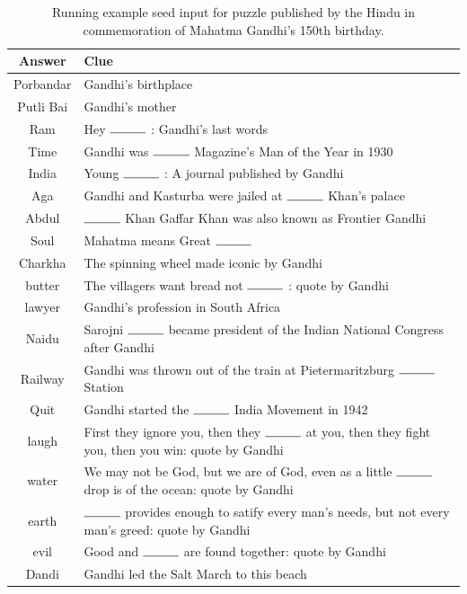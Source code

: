 \documentclass[twoside]{article}
\begin{document}
\begin{table}[h!]
  \begin{center}
    \begin{tabular}{c L}
      \toprule
      \textbf{Answer} & \textbf{Clue}  \\ 
      \midrule
      Porbandar & Gandhi's birthplace\\
      Putli Bai & Gandhi's mother\\
      Ram & Hey $\rule{1cm}{0.15mm}$ : Gandhi's last words\\
      Time & Gandhi was $\rule{1cm}{0.15mm}$  Magazine's Man of the Year in 1930\\
      India & Young $\rule{1cm}{0.15mm}$ : A journal published by Gandhi\\
      Aga & Gandhi and Kasturba were jailed at $\rule{1cm}{0.15mm}$  Khan's palace\\
      Abdul & $\rule{1cm}{0.15mm}$  Khan Gaffar Khan was also known as Frontier Gandhi\\
      Soul & Mahatma means Great $\rule{1cm}{0.15mm}$ \\
      Charkha & The spinning wheel made iconic by Gandhi\\
      butter & The villagers want bread not $\rule{1cm}{0.15mm}$ : quote by Gandhi\\
      lawyer & Gandhi's profession in South Africa\\
      Naidu & Sarojni $\rule{1cm}{0.15mm}$  became president of the Indian National Congress after Gandhi\\
      Railway & Gandhi was thrown out of the train at Pietermaritzburg $\rule{1cm}{0.15mm}$  Station\\
      Quit & Gandhi started the $\rule{1cm}{0.15mm}$  India Movement in 1942\\
      laugh & First they ignore you, then they $\rule{1cm}{0.15mm}$  at you, then they fight you, then you win: quote by Gandhi\\
      water & We may not be God, but we are of God, even as a little $\rule{1cm}{0.15mm}$  drop is of the ocean: quote by Gandhi \\
      earth & $\rule{1cm}{0.15mm}$ provides enough to satify every man's needs, but not every man's greed: quote by Gandhi\\
      evil & Good and $\rule{1cm}{0.15mm}$ are found together: quote by Gandhi\\
      Dandi & Gandhi led the Salt March to this beach\\
      \bottomrule
    \end{tabular}
    \caption{Running example seed input for puzzle published by the Hindu in commemoration of Mahatma Gandhi's 150th birthday.}
    \label{tab:table1}
  \end{center}
\end{table}
\end{document}
